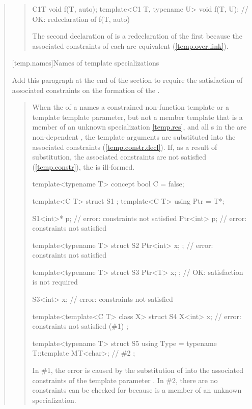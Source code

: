 \begin{quote}
\begin{quote}
\begin{codeblock}
C1{T} void f(T, auto);
template<C1 T, typename U> void f(T, U); // OK: redeclaration of f(T, auto)
\end{codeblock}
% 
\enternote
The second declaration of  is a redeclaration of the first
because the associated constraints of each are equivalent 
(\ref{temp.over.link}).
\exitnote
\exitexample

\end{quote}

[temp.names]{Names of template specializations}

Add this paragraph at the end of the section to require the satisfaction of 
associated constraints on the formation of the .

\begin{quote}
\setcounter{Paras}{7}
\pnum
When the  of a  names
a constrained non-function template or a template template parameter,
but not a member template that is a member of an unknown specialization
\ref{temp.res}, and all s in the
 are non-dependent , the 
template arguments are substituted into the associated constraints
(\ref{temp.constr.decl}). 
% 
If, as a result of substitution, the associated constraints are not 
satisfied (\ref{temp.constr}), the  is ill-formed.
% 
\enterexample
\begin{codeblock}
template<typename T> concept bool C = false;

template<C T> struct S1 { };
template<C T> using Ptr = T*;

S1<int>* p; // error: constraints not satisfied
Ptr<int> p; // error: constraints not satisfied

template<typename T>
  struct S2 { Ptr<int> x; }; // error: constraints not satisfied

template<typename T>
  struct S3 { Ptr<T> x; };   // OK: satisfaction is not required

S3<int> x;                   // error: constraints not satisfied

template<template<C T> class X>
  struct S4 {
    X<int> x; // error: constraints not satisfied (\#1)
  };

template<typename T>
  struct S5 {
    using Type = typename T::template MT<char>; // \#2
  };
\end{codeblock}
In \#1, the error is caused by the substitution of  into 
the associated constraints of the template parameter .
% 
In \#2, there are no constraints can be checked for 
 because  is a member
of an unknown specialization.
\exitexample
\end{quote}



\end{quote}
